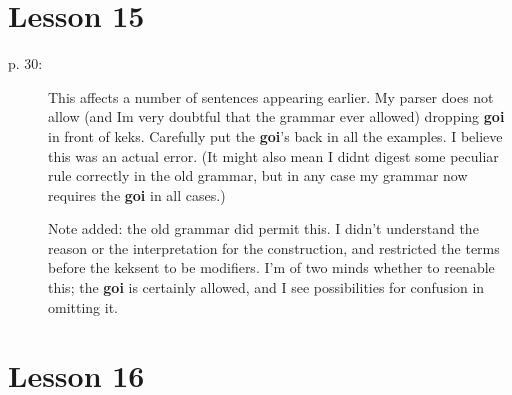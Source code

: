 \documentclass[12pt]{article}
\begin{document}
\section{Lesson 15}

\begin{description}

\item[p. 30:]  This affects a number of sentences appearing earlier.  My parser does not allow (and Im very doubtful that the grammar ever allowed) dropping {\bf goi} in front of keks.  Carefully put the {\bf goi}'s back in all the examples.  I believe this was an actual error.  (It might also mean I didnt digest some peculiar rule correctly in the old grammar, but in any case my grammar now requires the {\bf goi} in all cases.)

Note added:  the old grammar did permit this.  I didn't understand the reason or the interpretation for the construction, and restricted the terms before the keksent to be modifiers.  I'm of two minds whether to reenable this;  the {\bf goi} is certainly allowed, and I see possibilities for confusion in omitting it.

\end{description}

\section{Lesson 16}
\end{document}
